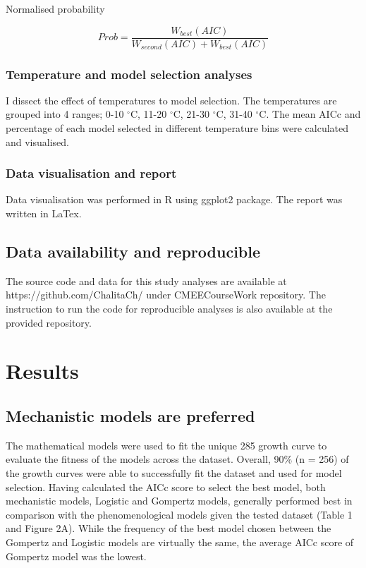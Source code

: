 \documentclass[12pt]{article}
\begin{document}
\begin{linenumbers}
\noindent Normalised probability

\begin{equation}
    Prob = \frac{W_{best}(AIC)}{W_{second}(AIC) + W_{best}(AIC)}
\end{equation}

\subsubsection{Temperature and model selection analyses}

\noindent I dissect the effect of temperatures to model selection. The temperatures are grouped into 4 ranges; 0-10 $^{\circ}$C, 11-20 $^{\circ}$C, 21-30 $^{\circ}$C, 31-40 $^{\circ}$C. The mean AICc and percentage of each model selected in different temperature bins were calculated and visualised. 

\subsubsection{Data visualisation and report}

\noindent Data visualisation was performed in R using ggplot2 package. The report was written in LaTex.

\subsection{Data availability and reproducible}

\noindent The source code and data for this study analyses are available at https://github.com/ChalitaCh/ under CMEECourseWork repository. The instruction to run the code for reproducible analyses is also available at the provided repository.

\newpage

\section{Results}

\subsection{Mechanistic models are preferred}

\noindent The mathematical models were used to fit the unique 285 growth curve to evaluate the fitness of the models across the dataset. Overall, 90\% (n = 256) of the growth curves were able to successfully fit the dataset and used for model selection. Having calculated the AICc score to select the best model, both mechanistic models, Logistic and Gompertz models, generally performed best in comparison with the phenomenological models given the tested dataset (Table 1 and Figure 2A). While the frequency of the best model chosen between the Gompertz and Logistic models are virtually the same, the average AICc score of Gompertz model was the lowest.


\end{linenumbers}
\end{document}
